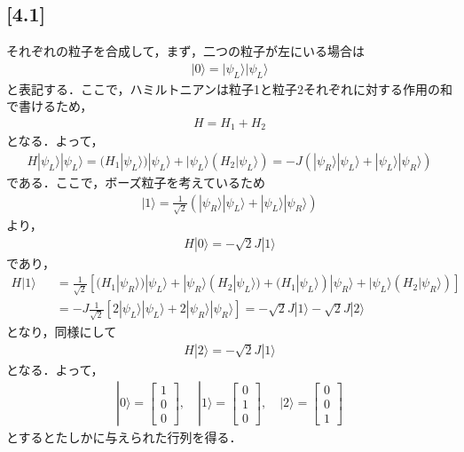 \documentclass[12pt,dvipdfmx]{jsarticle}
\begin{document}
\subsection*{\large{[4.1]}}
それぞれの粒子を合成して，まず，二つの粒子が左にいる場合は
\begin{eqnarray}
  |0\rangle = |\psi_L\rangle|\psi_L\rangle
\end{eqnarray}
と表記する．ここで，ハミルトニアンは粒子1と粒子2それぞれに対する作用の和で書けるため，
\begin{eqnarray}
  H = H_1 + H_2
\end{eqnarray}
となる．よって，
\begin{eqnarray}
  H |\psi_L\rangle|\psi_L\rangle = (H_1|\psi_L\rangle)|\psi_L\rangle + |\psi_L\rangle(H_2|\psi_L\rangle) = -J( |\psi_R\rangle|\psi_L\rangle+ |\psi_L\rangle|\psi_R\rangle )
\end{eqnarray}
である．ここで，ボーズ粒子を考えているため
\begin{eqnarray}
  |1\rangle = \frac{1}{\sqrt{2}}( |\psi_R\rangle|\psi_L\rangle+ |\psi_L\rangle|\psi_R\rangle )
\end{eqnarray}
より，
\begin{eqnarray}
  H|0\rangle = -\sqrt{2}J|1\rangle
\end{eqnarray}
であり，
\begin{eqnarray}
  H|1\rangle &&=\frac{1}{\sqrt{2}} \left[ (H_1|\psi_R\rangle)|\psi_L\rangle +|\psi_R\rangle(H_2|\psi_L\rangle)+(H_1|\psi_L\rangle)|\psi_R\rangle +|\psi_L\rangle(H_2|\psi_R\rangle) \right]\\
  &&=  -J\frac{1}{\sqrt{2}} \left[ 2|\psi_L\rangle|\psi_L\rangle + 2|\psi_R\rangle|\psi_R\rangle \right] = -\sqrt{2}J|1\rangle -\sqrt{2}J|2\rangle
\end{eqnarray}
となり，同様にして
\begin{eqnarray}
  H|2\rangle =  -\sqrt{2}J|1\rangle
\end{eqnarray}
となる．よって，
\begin{eqnarray}
  |0\rangle =
  \begin{bmatrix}
    1\\
    0\\
    0
  \end{bmatrix},\quad
  |1\rangle =
  \begin{bmatrix}
    0\\
    1\\
    0
  \end{bmatrix},\quad
  |2\rangle =
  \begin{bmatrix}
    0\\
    0\\
    1
  \end{bmatrix}
\end{eqnarray}
とするとたしかに与えられた行列を得る．
\end{document}

